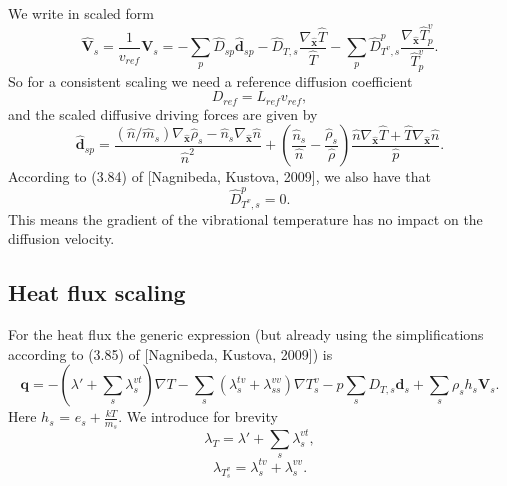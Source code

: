 \documentclass[a4paper,11pt,english]{article}
\begin{document}
We write in scaled form
\begin{equation}
     \hat{\mathbf{V}}_s = \frac{1}{v_{ref}}\mathbf{V}_s = -\sum_{p} \hat{D}_{sp}\hat{\mathbf{d}}_{sp} - \hat{D}_{T,s} \frac{\nabla_{\hat{\mathbf{x}}} \hat{T}}{\hat{T}} - \sum_{p} \hat{D}^{p}_{T^v,s} \frac{\nabla_{\hat{\mathbf{x}}} \hat{T}^v_p}{\hat{T}^v_p}.
\end{equation}
So for a consistent scaling we need a reference diffusion coefficient
\begin{equation}
     D_{ref} = L_{ref} v_{ref},
\end{equation}
and the scaled diffusive driving forces are given by
\begin{equation}
     \hat{\mathbf{d}}_{sp} = \frac{(\hat{n} / \hat{m}_s) \nabla_{\hat{\mathbf{x}}} \hat{\rho}_s - \hat{n}_s \nabla_{\hat{\mathbf{x}}} \hat{n}}{\hat{n}^2} + \left(\frac{\hat{n}_s}{\hat{n}} - \frac{\hat{\rho}_s}{\hat{\rho}}\right) \frac{\hat{n} \nabla_{\hat{\mathbf{x}}} \hat{T} + \hat{T} \nabla_{\hat{\mathbf{x}}} \hat{n}}{\hat{p}}.
\end{equation}
According to (3.84) of [Nagnibeda, Kustova, 2009], we also have that
\begin{equation}
     \hat{D}^{p}_{T^v,s} = 0.
\end{equation}
This means the gradient of the vibrational temperature has no impact on the diffusion velocity.

\subsection{Heat flux scaling}
For the heat flux the generic expression (but already using the simplifications according to (3.85) of [Nagnibeda, Kustova, 2009]) is %
\begin{equation}
     \mathbf{q} = -\left(\lambda' + \sum_s\lambda^{vt}_s\right) \nabla T - \sum_{s}\left(\lambda^{tv}_s + \lambda^{vv}_{ss}\right)\nabla T^v_s
     - p \sum_s {D}_{T,s} \mathbf{d}_s + \sum_s \rho_s h_s \mathbf{V}_s.
\end{equation}
Here $h_s$ = $e_s + \frac{kT}{m_s}$.
We introduce for brevity
\begin{equation}
     \lambda_T = \lambda' + \sum_s\lambda^{vt}_s,
\end{equation}
\begin{equation}
     \lambda_{T^v_s} = \lambda^{tv}_s + \lambda^{vv}_s.
\end{equation}
\end{document}
